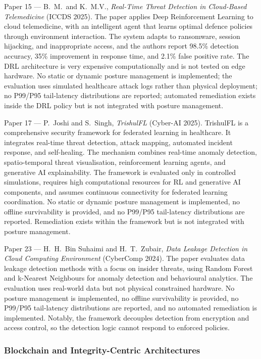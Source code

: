 {Paper 15 --- B.~M.~and K.~M.V., \textit{Real-Time Threat Detection in Cloud-Based Telemedicine} (ICCDS 2025).} The paper applies Deep Reinforcement Learning to cloud telemedicine, with an intelligent agent that learns optimal defence policies through environment interaction. The system adapts to ransomware, session hijacking, and inappropriate access, and the authors report 98.5\% detection accuracy, 35\% improvement in response time, and 2.1\% false positive rate. The DRL architecture is very expensive computationally and is not tested on edge hardware. No static or dynamic posture management is implemented; the evaluation uses simulated healthcare attack logs rather than physical deployment; no P99/P95 tail-latency distributions are reported; automated remediation exists inside the DRL policy but is not integrated with posture management.

{Paper 17 --- P.~Joshi and S.~Singh, \textit{TrishulFL} (Cyber-AI 2025).} TrishulFL is a comprehensive security framework for federated learning in healthcare. It integrates real-time threat detection, attack mapping, automated incident response, and self-healing. The mechanism combines real-time anomaly detection, spatio-temporal threat visualisation, reinforcement learning agents, and generative AI explainability. The framework is evaluated only in controlled simulations, requires high computational resources for RL and generative AI components, and assumes continuous connectivity for federated learning coordination. No static or dynamic posture management is implemented, no offline survivability is provided, and no P99/P95 tail-latency distributions are reported. Remediation exists within the framework but is not integrated with posture management.

{Paper 23 --- H.~H.~Bin Suhaimi and H.~T.~Zubair, \textit{Data Leakage Detection in Cloud Computing Environment} (CyberComp 2024).} The paper evaluates data leakage detection methods with a focus on insider threats, using Random Forest and k-Nearest Neighbours for anomaly detection and behavioural analytics. The evaluation uses real-world data but not physical constrained hardware. No posture management is implemented, no offline survivability is provided, no P99/P95 tail-latency distributions are reported, and no automated remediation is implemented. Notably, the framework decouples detection from encryption and access control, so the detection logic cannot respond to enforced policies.

\subsubsection{Blockchain and Integrity-Centric Architectures}

